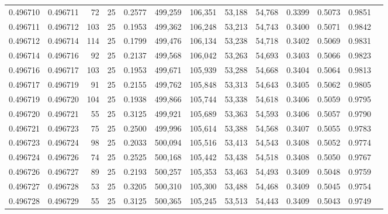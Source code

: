 \begin{tabular}{rrrrrrrrrrrrr}
0.496710 & 0.496711 &    72 &  25 &                                     0.2577 & 499,259 & 106,351 &  53,188 &  54,768 & 0.3399 & 0.5073 & 0.9851 \\
0.496711 & 0.496712 &   103 &  25 &                                     0.1953 & 499,362 & 106,248 &  53,213 &  54,743 & 0.3400 & 0.5071 & 0.9842 \\
0.496712 & 0.496714 &   114 &  25 &                                     0.1799 & 499,476 & 106,134 &  53,238 &  54,718 & 0.3402 & 0.5069 & 0.9831 \\
0.496714 & 0.496716 &    92 &  25 &                                     0.2137 & 499,568 & 106,042 &  53,263 &  54,693 & 0.3403 & 0.5066 & 0.9823 \\
0.496716 & 0.496717 &   103 &  25 &                                     0.1953 & 499,671 & 105,939 &  53,288 &  54,668 & 0.3404 & 0.5064 & 0.9813 \\
0.496717 & 0.496719 &    91 &  25 &                                     0.2155 & 499,762 & 105,848 &  53,313 &  54,643 & 0.3405 & 0.5062 & 0.9805 \\
0.496719 & 0.496720 &   104 &  25 &                                     0.1938 & 499,866 & 105,744 &  53,338 &  54,618 & 0.3406 & 0.5059 & 0.9795 \\
0.496720 & 0.496721 &    55 &  25 &                                     0.3125 & 499,921 & 105,689 &  53,363 &  54,593 & 0.3406 & 0.5057 & 0.9790 \\
0.496721 & 0.496723 &    75 &  25 &                                     0.2500 & 499,996 & 105,614 &  53,388 &  54,568 & 0.3407 & 0.5055 & 0.9783 \\
0.496723 & 0.496724 &    98 &  25 &                                     0.2033 & 500,094 & 105,516 &  53,413 &  54,543 & 0.3408 & 0.5052 & 0.9774 \\
0.496724 & 0.496726 &    74 &  25 &                                     0.2525 & 500,168 & 105,442 &  53,438 &  54,518 & 0.3408 & 0.5050 & 0.9767 \\
0.496726 & 0.496727 &    89 &  25 &                                     0.2193 & 500,257 & 105,353 &  53,463 &  54,493 & 0.3409 & 0.5048 & 0.9759 \\
0.496727 & 0.496728 &    53 &  25 &                                     0.3205 & 500,310 & 105,300 &  53,488 &  54,468 & 0.3409 & 0.5045 & 0.9754 \\
0.496728 & 0.496729 &    55 &  25 &                                     0.3125 & 500,365 & 105,245 &  53,513 &  54,443 & 0.3409 & 0.5043 & 0.9749 \\

\end{tabular}
